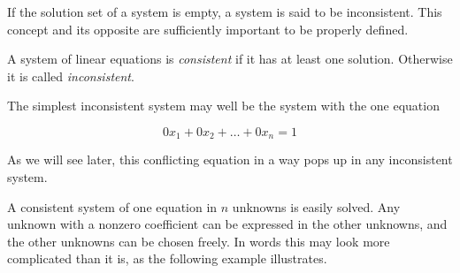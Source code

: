 If the solution set of a system is empty, a system is said to be inconsistent. 
This concept and its opposite are sufficiently important to be properly defined. 

\begin{dfn}
\label{Dfn:LinSystems:Consistent}
A system of linear equations is \emph{consistent} if it has at least one solution.  Otherwise it is called \emph{inconsistent}. 
\end{dfn}

\begin{ex}
\label{Ex:LinSystems:InconsistentEquation}
The simplest inconsistent system may well be the system with the one equation

$$

   0x_1 + 0x_2 + \ldots + 0x_n = 1
$$

As we will see later, this conflicting equation in a way pops up in any inconsistent system.
\end{ex}

A consistent system of one equation in $n$ unknowns is easily solved. 
Any unknown with a nonzero coefficient can be expressed in the other unknowns,
and the other unknowns can be chosen freely.  In words this may look more complicated than it is, as the following example illustrates.

